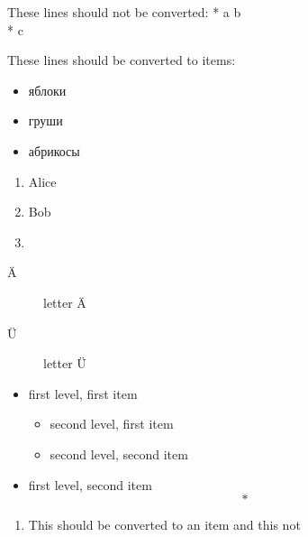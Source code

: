 These lines should not be converted:
* a
\* b
\\* c


These lines should be converted to items:
\begin{itemize}
  \item яблоки
  \item груши
  \item абрикосы
\end{itemize}

\begin{enumerate}
  \item Alice
  \item Bob
  \item
\end{enumerate}

\begin{description}
  \item [Ä] letter Ä
  \item [Ü] letter Ü
\end{description}


\begin{itemize}
  \item first level, first item
    \begin{itemize}
      \item second level, first item
      \item second level, second item
    \end{itemize}
  \item first level, second item
    \begin{equation}
      * %
    \end{equation}
\end{itemize}


\begin{enumerate}
  \item This should be converted to an item
  \* and this not
\end{enumerate}
